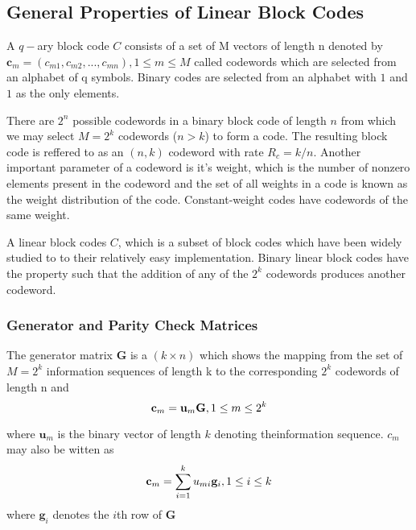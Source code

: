 \documentclass[fontsize=12pt]{article}
\begin{document}
 \subsection{General Properties of Linear Block Codes}
 A $q-$ary block code $C$ consists of a set of M vectors of length n denoted by $\mathbf{c}_m=(c_{m1},c_{m2},...,c_{mn}), 1 \leq m \leq M$ called codewords which are selected from an alphabet of q symbols. Binary codes are selected from an alphabet with $1$ and $1$ as the only elements.
 
 There are $2^n$ possible codewords in a binary block code of length $n$ from which we may select $M=2^k$ codewords ($n>k$) to form a code. The resulting block code is reffered to as an $(n,k)$ codeword with rate $R_c=k/n$. Another important parameter of a codeword is it's weight, which is the number of nonzero elements present in the codeword and the set of all weights in a code is known as the weight distribution of the code. Constant-weight codes have codewords of the same weight.
 
A linear block codes $C$, which is a subset of block codes which have been widely studied to to their relatively easy implementation. Binary linear block codes have the   property such that the addition of any of the $2^k$ codewords produces another codeword.

\subsubsection{Generator and Parity Check Matrices}
 The generator matrix $\mathbf{G}$ is a $(k \times n)$ which shows the mapping from the set of $M=2^k$ information sequences of length k to the corresponding $2^k$ codewords of length n and 
 \begin{equation}
 \mathbf{c}_m =\mathbf{u}_m\mathbf{G}, \\\\\\\\\\\\ 1 \leq m \leq 2^k
 \end{equation}
 
 where $\mathbf{u}_m$ is the binary vector of length $k$ denoting theinformation sequence. $c_m$ may also be witten as 
  \begin{equation}
 \mathbf{c}_m =\sum_{i=1}^{k}{u}_{mi}\mathbf{g}_i, \\\\\\\\\\\\ 1 \leq i \leq k
 \end{equation}
 where $\mathbf{g}_i$ denotes the $i$th row of $\mathbf{G}$
 
\end{document}
